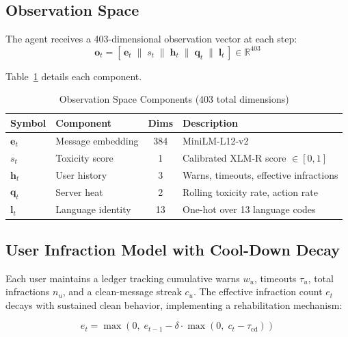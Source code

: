 \documentclass[journal]{IEEEtran}
\begin{document}
\subsection{Observation Space}

The agent receives a 403-dimensional observation vector at each step:
\begin{equation}\label{eq:obs}
  \mathbf{o}_t = \left[\,\mathbf{e}_t \;\|\; s_t \;\|\; \mathbf{h}_t \;\|\;
                        \mathbf{q}_t \;\|\; \mathbf{l}_t\,\right] \in \mathbb{R}^{403}
\end{equation}

Table~\ref{tab:obs_space} details each component.

\begin{table}[!t]
  \renewcommand{\arraystretch}{1.3}
  \caption{Observation Space Components (403 total dimensions)}
  \label{tab:obs_space}
  \centering
  \begin{tabular}{llcl}
    \toprule
    Symbol & Component & Dims & Description \\
    \midrule
    $\mathbf{e}_t$ & Message embedding    & 384 & MiniLM-L12-v2~\cite{reimers2019} \\
    $s_t$          & Toxicity score       & 1   & Calibrated XLM-R score $\in[0,1]$ \\
    $\mathbf{h}_t$ & User history         & 3   & Warns, timeouts, effective infractions \\
    $\mathbf{q}_t$ & Server heat          & 2   & Rolling toxicity rate, action rate \\
    $\mathbf{l}_t$ & Language identity    & 13  & One-hot over 13 language codes \\
    \bottomrule
  \end{tabular}
\end{table}

\subsection{User Infraction Model with Cool-Down Decay}

Each user maintains a ledger tracking cumulative warns $w_u$, timeouts $\tau_u$, total
infractions $n_u$, and a clean-message streak $c_u$. The effective infraction count $e_t$
decays with sustained clean behavior, implementing a rehabilitation mechanism:

\begin{equation}\label{eq:decay}
  e_t = \max\!\left(0,\; e_{t-1} - \delta \cdot \max\!\left(0,\; c_t - \tau_{\text{cd}}\right)\right)
\end{equation}
\end{document}
